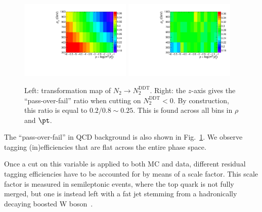 \begin{figure}
  \centering
  \includegraphics[width=0.475\textwidth]{figures/higgstagging/n2ddt/h2ddt.pdf}
  \includegraphics[width=0.475\textwidth]{figures/higgstagging/n2ddt/h2_rhoVpt_pafa.pdf}\\
  \caption{Left: transformation map of $N_2\rightarrow N_2^{\text{DDT}}$. Right: the $z$-axis gives the ``pass-over-fail'' ratio when cutting on $N_2^\text{DDT}<0$. By construction, this ratio is equal to $0.2/0.8\sim0.25$. This is found across all bins in $\rho$ and $\pt$.}
  \label{fig:transmap_20percent}
\end{figure}

The ``pass-over-fail'' in QCD background is also shown in Fig.~\ref{fig:transmap_20percent}. We observe tagging (in)efficiencies that are flat across the entire phase space. 


Once a cut on this variable is applied to both MC and data, different residual tagging efficiencies have to be accounted for by means of a scale factor. This scale factor is measured in semileptonic \ttbar events, where the top quark is not fully merged, but one is instead left with a fat jet stemming from a hadronically decaying boosted W boson~\cite{monoH}.



